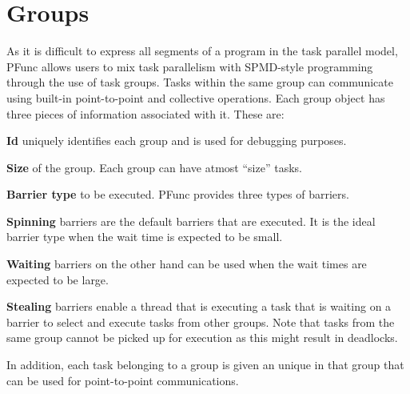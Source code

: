 \section{Groups}
\label{sec:group}
As it is difficult to express all segments of a program in the task parallel
model, PFunc allows users to mix task parallelism with SPMD-style programming
through the use of task groups.  Tasks within the same group can communicate
using built-in point-to-point and collective operations. Each group object has
three pieces of information associated with it. These are:

\begin{list}{}{\leftmargin=1em}
\item \textbf{Id} uniquely identifies each group and is used for debugging
purposes.
\item \textbf{Size} of the group. Each group can have atmost ``size'' tasks.
\item \textbf{Barrier type} to be executed. PFunc provides three types of
barriers.
  \begin{list}{}{\leftmargin=1em}
  \item \textbf{Spinning} barriers are the default barriers that are executed.
  It is the ideal barrier type when the wait time is expected to be small.
  \item \textbf{Waiting} barriers on the other hand can be used when the wait 
  times are expected to be large.
  \item \textbf{Stealing} barriers enable a thread that is executing a task 
  that is waiting on a barrier to select and execute tasks from other groups.
  Note that tasks from the same group cannot be picked up for execution as 
  this might result in deadlocks.
  \end{list}
\end{list}

In addition, each task belonging to a group is given an unique  in
that group that can be used for point-to-point communications.

